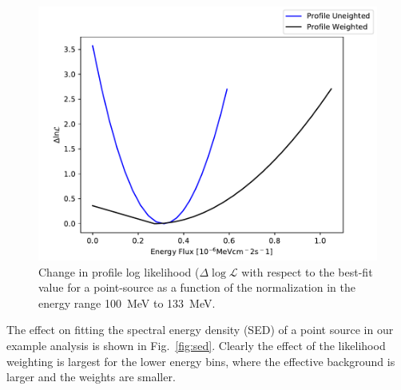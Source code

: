 \documentclass[preprint]{aastex}
\begin{document}
\begin{figure}[h]  
\begin{centering}
\includegraphics[width=\columnwidth]{figures/ll_compare.pdf}
\vspace{-0.10in}
\caption{\label{fig:ll}Change in profile log likelihood ($\Delta\log\mathcal{L}$ with 
  respect to the best-fit value for a point-source as a function of the normalization in the 
  energy range 100~MeV to 133~MeV.}
\end{centering}
\end{figure}

The effect on fitting the spectral energy density (SED) of a point 
source in our example analysis is shown in Fig.~\ref{fig:sed}.  Clearly 
the effect of the likelihood weighting is largest for the lower energy bins, 
where the effective background is larger and the
weights are smaller.
\end{document}
